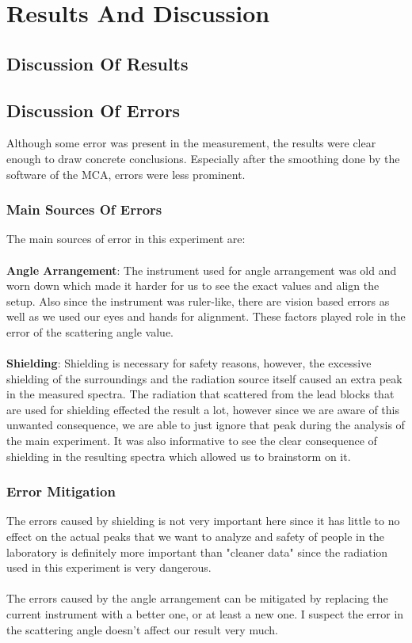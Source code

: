 \section{Results And Discussion}

	\subsection{Discussion Of Results}
	
	\subsection{Discussion Of Errors}
		Although some error was present in the measurement, the results were clear enough to draw concrete conclusions. Especially after the smoothing done by the software of the MCA, errors were less prominent.
	
		\subsubsection{Main Sources Of Errors}
			The main sources of error in this experiment are:
			\\
			\\
				\textbf{Angle Arrangement}: 
					The instrument used for angle arrangement was old and worn down which made it harder for us to see the exact values and align the setup. Also since the instrument was ruler-like, there are vision based errors as well as we used our eyes and hands for alignment. These factors played role in the error of the scattering angle value.
					\\
					\\
				\textbf{Shielding}: 
					Shielding is necessary for safety reasons, however, the excessive shielding of the surroundings and the radiation source itself caused an extra peak in the measured spectra. The radiation that scattered from the lead blocks that are used for shielding effected the result a lot, however since we are aware of this unwanted consequence, we are able to just ignore that peak during the analysis of the main experiment. It was also informative to see the clear consequence of shielding in the resulting spectra which allowed us to brainstorm on it. 
		\subsubsection{Error Mitigation}
			The errors caused by shielding is not very important here since it has little to no effect on the actual peaks that we want to analyze and safety of people in the laboratory is definitely more important than "cleaner data" since the radiation used in this experiment is very dangerous. 
			\\
			\\
			The errors caused by the angle arrangement can be mitigated by replacing the current instrument with a better one, or at least a new one. I suspect the error in the scattering angle doesn't affect our result very much.